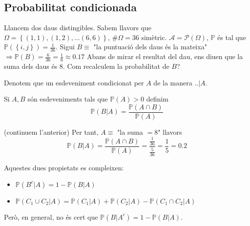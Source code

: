 \documentclass[../main.tex]{subfiles}
\begin{document}
    \subsection{Probabilitat condicionada}
    \begin{exemple}
        Llancem dos daus distingibles. Sabem llavors que \\$\Omega = \left\{ \left(1,1\right), \left(1,2\right), \dots  \left(6,6\right) \right\}$,
        $\#\Omega = 36$ simètric. $\mathcal{A} = \mathcal{P}\left(\Omega\right)$, $\mathbb{P}$ és
        tal que $\mathbb{P}\left(\left\{i,j\right\} \right) = \frac{1}{36}$. Sigui $B \equiv $ "la
        puntuació dels daus és la mateixa" $\Rightarrow \mathbb{P}\left(B\right) = \frac{6}{36} = \frac{1}{6} \approx 0.17$
        Abans de mirar el resultat del dau, ens diuen que la suma dels daus és $8$. Com recalculem
        la probabilitat de $B$?
    \end{exemple}
    \begin{notacio}
        Denotem que un esdeveniment condicionat per $A$ de la manera $..|A$.
    \end{notacio}
    \begin{definicio}
        Si $A, B$ són esdeveniments tals que $\mathbb{P}\left(A\right)>0$ definim
        \begin{displaymath}
            \mathbb{P}\left(B|A\right) = \frac{\mathbb{P}\left(A\cap B\right)}{\mathbb{P}\left(A\right)}
        \end{displaymath}
    \end{definicio}
    \begin{exemple}(continuem l'anterior)
        Per tant, $A \equiv$ "la suma $=8$" llavors
        \begin{displaymath}
            \mathbb{P}\left(B|A\right) = \frac{\mathbb{P}\left(A\cap B\right)}{\mathbb{P}\left(A\right)} = \frac{\frac{1}{36}}{\frac{5}{36}} = \frac{1}{5} = 0.2 
        \end{displaymath}
    \end{exemple}
    \begin{obs}Aquestes dues propietats es compleixen:
        \begin{itemize}
            \item $\mathbb{P}\left(B^c|A\right) = 1 - \mathbb{P}\left(B|A\right)$
            \item $\mathbb{P}\left(C_1 \cup C_2 | A\right) = \mathbb{P}\left(C_1|A\right) + \mathbb{P}\left(C_2|A\right) - \mathbb{P}\left(C_1 \cap C_2|A\right)$
        \end{itemize}
        Però, en general, no és cert que $\mathbb{P}\left(B|A^c\right) = 1 - \mathbb{P}\left(B|A\right)$.
    \end{obs}
\end{document}
